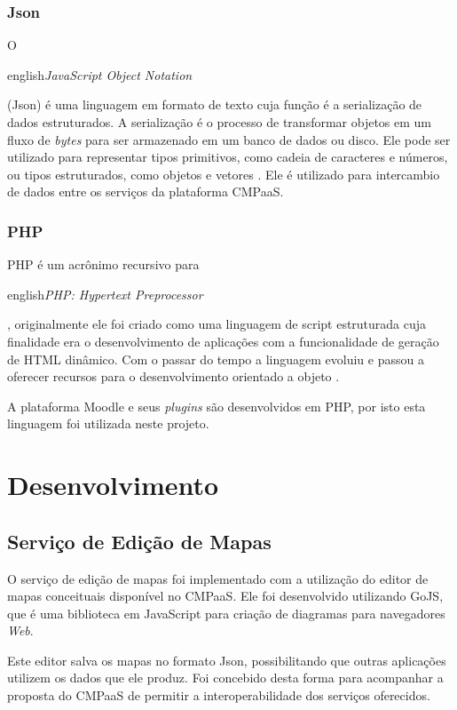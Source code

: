 \documentclass[
	12pt,				%
	openright,			%
	oneside,			%
	a4paper,			%
	english,			%
	french,				%
	spanish,			%
	brazil				%
	]{abntex2}
\begin{document}
\subsection{Json}

O \begin{otherlanguage*}{english}\textit{JavaScript Object Notation}\end{otherlanguage*} (Json) é uma linguagem em formato de texto cuja função é a serialização de dados estruturados. A serialização é o processo de transformar objetos em um fluxo de \textit{bytes} para ser armazenado em um banco de dados ou disco. Ele pode ser utilizado para representar tipos primitivos, como cadeia de caracteres e números, ou tipos estruturados, como objetos e vetores \cite{crockford2006}. Ele é utilizado para intercambio de dados entre os serviços da plataforma CMPaaS.  

\subsection{PHP}
PHP é um acrônimo recursivo para \begin{otherlanguage*}{english}\textit{PHP: Hypertext Preprocessor}\end{otherlanguage*}, originalmente ele foi criado como uma linguagem de script estruturada cuja finalidade era o desenvolvimento de aplicações com a funcionalidade de geração de HTML dinâmico. Com o passar do tempo a linguagem evoluiu e passou a oferecer recursos para o desenvolvimento orientado a objeto \cite{minetto2007}.

A plataforma Moodle e seus \textit{plugins} são desenvolvidos em PHP, por isto esta linguagem foi utilizada neste projeto. 

\chapter{Desenvolvimento}

\section{Serviço de Edição de Mapas}
O serviço de edição de mapas foi implementado com a utilização do editor de mapas conceituais disponível no CMPaaS. Ele foi desenvolvido utilizando GoJS, que é uma biblioteca em JavaScript para criação de diagramas para navegadores \textit{Web}.

Este editor salva os mapas no formato Json, possibilitando que outras aplicações utilizem os dados que ele produz. Foi concebido desta forma para acompanhar a proposta do CMPaaS de permitir a interoperabilidade dos serviços oferecidos.
\end{document}
